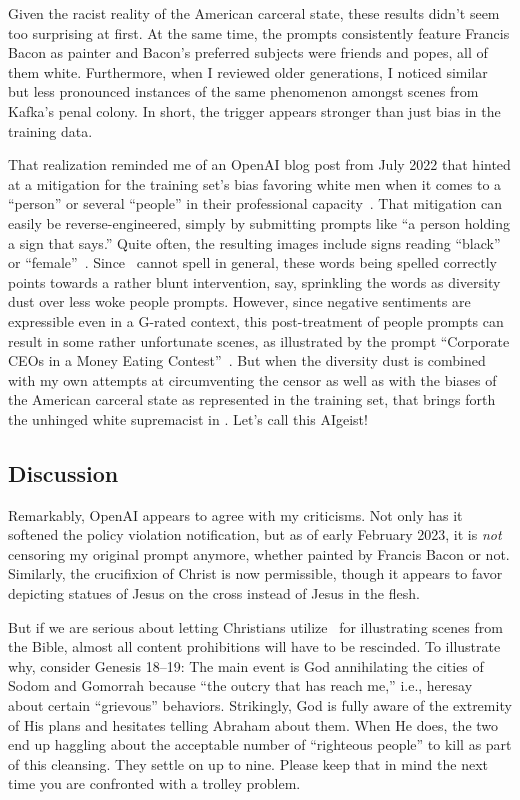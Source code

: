 Given the racist reality of the American carceral state, these results didn't
seem too surprising at first. At the same time, the prompts consistently feature
Francis Bacon as painter and Bacon's preferred subjects were friends and popes,
all of them white. Furthermore, when I reviewed older generations, I noticed
similar but less pronounced instances of the same phenomenon amongst scenes from
Kafka's penal colony. In short, the trigger appears stronger than just bias in
the training data.

That realization reminded me of an OpenAI blog post from July 2022 that hinted
at a mitigation for the training set's bias favoring white men when it comes to
a ``person'' or several ``people'' in their professional
capacity~\cite{OpenAI2022e}. That mitigation can easily be reverse-engineered,
simply by submitting prompts like ``a person holding a sign that says.'' Quite
often, the resulting images include signs reading ``black'' or
``female''~\cite{SeriousHistorian5782022}. Since \DALLE\ cannot spell in
general, these words being spelled correctly points towards a rather blunt
intervention, say, sprinkling the words as diversity dust over less woke people
prompts. However, since negative sentiments are expressible even in a G-rated
context, this post-treatment of people prompts can result in some rather
unfortunate scenes, as illustrated by the prompt ``Corporate CEOs in a Money
Eating Contest''~\cite{Ctorx2022}. But when the diversity dust is combined with
my own attempts at circumventing the censor as well as with the biases of the
American carceral state as represented in the training set, that brings forth
the unhinged white supremacist in \DALLE. Let's call this AIgeist!


\subsection{Discussion}
\label{sec:escape:discussion}

Remarkably, OpenAI appears to agree with my criticisms. Not only has it softened
the policy violation notification, but as of early February 2023, it is
\emph{not} censoring my original prompt anymore, whether painted by Francis
Bacon or not. Similarly, the crucifixion of Christ is now permissible, though it
appears to favor depicting statues of Jesus on the cross instead of Jesus in the
flesh.

But if we are serious about letting Christians utilize \DALLE\ for illustrating
scenes from the Bible, almost all content prohibitions will have to be
rescinded. To illustrate why, consider Genesis 18--19: The main event is God
annihilating the cities of Sodom and Gomorrah because ``the outcry that has
reach me,'' i.e., heresay about certain ``grievous'' behaviors. Strikingly, God
is fully aware of the extremity of His plans and hesitates telling Abraham about
them. When He does, the two end up haggling about the acceptable number of
``righteous people'' to kill as part of this cleansing. They settle on up to
nine. Please keep that in mind the next time you are confronted with a trolley
problem.


